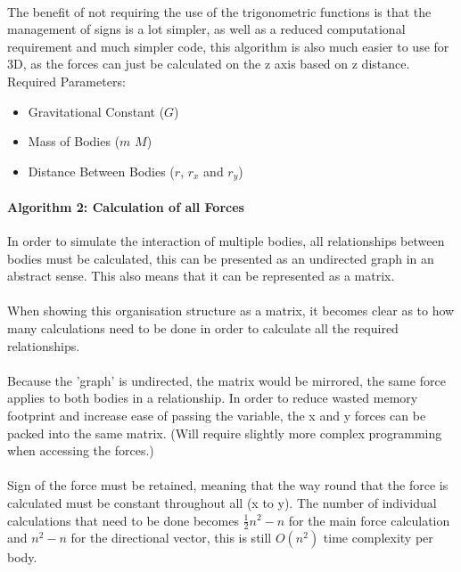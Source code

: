 \paragraph{}
The benefit of not requiring the use of the trigonometric functions is that the management of signs is a lot simpler, as well as a reduced computational requirement and much simpler code, this algorithm is also much easier to use for 3D, as the forces can just be calculated on the z axis based on z distance. \\

Required Parameters:
\begin{itemize}
\item Gravitational Constant ($G$)
\item Mass of Bodies ($m$ $M$)
\item Distance Between Bodies ($r$, $r_x$ and $r_y$)
\end{itemize}

\paragraph{Algorithm 2: Calculation of all Forces}
In order to simulate the interaction of multiple bodies, all relationships between bodies must be calculated, this can be presented as an undirected graph in an abstract sense. This also means that it can be represented as a matrix. 

\paragraph{}
When showing this organisation structure as a matrix, it becomes clear as to how many calculations need to be done in order to calculate all the required relationships.

\paragraph{}
Because the 'graph' is undirected, the matrix would be mirrored, the same force applies to both bodies in a relationship.
In order to reduce wasted memory footprint and increase ease of passing the variable, the x and y forces can be packed into the same matrix. (Will require slightly more complex programming when accessing the forces.)

\paragraph{}
Sign of the force must be retained, meaning that the way round that the force is calculated must be constant throughout all (x to y).
The number of individual calculations that need to be done becomes $\frac{1}{2}n^2-n$ for the main force calculation and $n^2-n$ for the directional vector, this is still $O(n^2)$ time complexity per body. \\\

